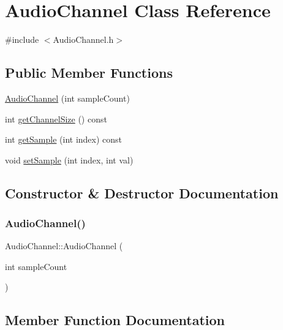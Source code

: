 \hypertarget{class_audio_channel}{}\section{Audio\+Channel Class Reference}
\label{class_audio_channel}


{\ttfamily \#include $<$Audio\+Channel.\+h$>$}

\subsection*{Public Member Functions}
\begin{DoxyCompactItemize}
\item 
\hyperlink{class_audio_channel_a8ee2481871236bab12f567830fc8361b}{Audio\+Channel} (int sample\+Count)
\item 
int \hyperlink{class_audio_channel_a6a8bcd65a43fe0697c3368559c5775ca}{get\+Channel\+Size} () const
\item 
int \hyperlink{class_audio_channel_a5030a4c2bcf41e1f13479de45bbf6d01}{get\+Sample} (int index) const
\item 
void \hyperlink{class_audio_channel_a64bcb02bc7c731bc87d60c0ffabe7e99}{set\+Sample} (int index, int val)
\end{DoxyCompactItemize}


\subsection{Constructor \& Destructor Documentation}
\mbox{\label{class_audio_channel_a8ee2481871236bab12f567830fc8361b}} 
\subsubsection{\texorpdfstring{Audio\+Channel()}{AudioChannel()}}
{\footnotesize\ttfamily Audio\+Channel\+::\+Audio\+Channel (\begin{DoxyParamCaption}\item[{int}]{sample\+Count }\end{DoxyParamCaption})\hspace{0.3cm}{\ttfamily [inline]}}



\subsection{Member Function Documentation}
\mbox{\label{class_audio_channel_a6a8bcd65a43fe0697c3368559c5775ca}} 

